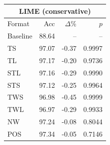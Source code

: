 \begin{tabular}{lrrr}
\toprule
\multicolumn{4}{c}{\textbf{LIME (conservative)}} \\
\midrule
Format & Acc & $\Delta$\% & $p$ \\
\midrule
Baseline & 88.64 & -- & -- \\
\midrule
TS & 97.07 & -0.37 & 0.9997 \\
TL & 97.17 & -0.20 & 0.9736 \\
STL & 97.16 & -0.29 & 0.9990 \\
STS & 97.12 & -0.25 & 0.9964 \\
TWS & 96.98 & -0.45 & 0.9999 \\
TWL & 96.97 & -0.29 & 0.9933 \\
NW & 97.24 & -0.08 & 0.8044 \\
POS & 97.34 & -0.05 & 0.7146 \\
\bottomrule
\end{tabular}